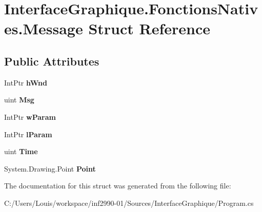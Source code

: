 \hypertarget{struct_interface_graphique_1_1_fonctions_natives_1_1_message}{}\section{Interface\+Graphique.\+Fonctions\+Natives.\+Message Struct Reference}
\label{struct_interface_graphique_1_1_fonctions_natives_1_1_message}
\subsection*{Public Attributes}
\begin{DoxyCompactItemize}
\item 
\hypertarget{struct_interface_graphique_1_1_fonctions_natives_1_1_message_aa25d996ad709246eecada71a0f375b21}{}Int\+Ptr {\bfseries h\+Wnd}\label{struct_interface_graphique_1_1_fonctions_natives_1_1_message_aa25d996ad709246eecada71a0f375b21}

\item 
\hypertarget{struct_interface_graphique_1_1_fonctions_natives_1_1_message_a1b1dfd72e58f292bbd24d6dc7a0b0f61}{}uint {\bfseries Msg}\label{struct_interface_graphique_1_1_fonctions_natives_1_1_message_a1b1dfd72e58f292bbd24d6dc7a0b0f61}

\item 
\hypertarget{struct_interface_graphique_1_1_fonctions_natives_1_1_message_aa04705defc08a7fea09f90b1cd069e20}{}Int\+Ptr {\bfseries w\+Param}\label{struct_interface_graphique_1_1_fonctions_natives_1_1_message_aa04705defc08a7fea09f90b1cd069e20}

\item 
\hypertarget{struct_interface_graphique_1_1_fonctions_natives_1_1_message_afc019b6c13559ba2a12a64e24eba9baf}{}Int\+Ptr {\bfseries l\+Param}\label{struct_interface_graphique_1_1_fonctions_natives_1_1_message_afc019b6c13559ba2a12a64e24eba9baf}

\item 
\hypertarget{struct_interface_graphique_1_1_fonctions_natives_1_1_message_ae0ab10151482b01c9c5fe1cb4e8a2306}{}uint {\bfseries Time}\label{struct_interface_graphique_1_1_fonctions_natives_1_1_message_ae0ab10151482b01c9c5fe1cb4e8a2306}

\item 
\hypertarget{struct_interface_graphique_1_1_fonctions_natives_1_1_message_a9dc93f6c7f6db4f91386aef27b0a77ad}{}System.\+Drawing.\+Point {\bfseries Point}\label{struct_interface_graphique_1_1_fonctions_natives_1_1_message_a9dc93f6c7f6db4f91386aef27b0a77ad}

\end{DoxyCompactItemize}


The documentation for this struct was generated from the following file\+:\begin{DoxyCompactItemize}
\item 
C\+:/\+Users/\+Louis/workspace/inf2990-\/01/\+Sources/\+Interface\+Graphique/Program.\+cs\end{DoxyCompactItemize}
